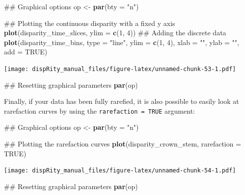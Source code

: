 \documentclass[]{book}
\newenvironment{Shaded}{\begin{snugshade}}{\end{snugshade}}
\newcommand{\KeywordTok}[1]{\textcolor[rgb]{0.13,0.29,0.53}{\textbf{#1}}}
\newcommand{\DataTypeTok}[1]{\textcolor[rgb]{0.13,0.29,0.53}{#1}}
\newcommand{\DecValTok}[1]{\textcolor[rgb]{0.00,0.00,0.81}{#1}}
\newcommand{\StringTok}[1]{\textcolor[rgb]{0.31,0.60,0.02}{#1}}
\newcommand{\OtherTok}[1]{\textcolor[rgb]{0.56,0.35,0.01}{#1}}
\newcommand{\NormalTok}[1]{#1}
\theoremstyle{definition}
\theoremstyle{definition}
\theoremstyle{remark}
\begin{document}
\begin{Shaded}
\begin{Highlighting}[]
\NormalTok{## Graphical options}
\NormalTok{op <-}\StringTok{ }\KeywordTok{par}\NormalTok{(}\DataTypeTok{bty =} \StringTok{"n"}\NormalTok{)}

\NormalTok{## Plotting the continuous disparity with a fixed y axis}
\KeywordTok{plot}\NormalTok{(disparity_time_slices, }\DataTypeTok{ylim =} \KeywordTok{c}\NormalTok{(}\DecValTok{1}\NormalTok{, }\DecValTok{4}\NormalTok{))}
\NormalTok{## Adding the discrete data}
\KeywordTok{plot}\NormalTok{(disparity_time_bins, }\DataTypeTok{type =} \StringTok{"line"}\NormalTok{, }\DataTypeTok{ylim =} \KeywordTok{c}\NormalTok{(}\DecValTok{1}\NormalTok{, }\DecValTok{4}\NormalTok{), }\DataTypeTok{xlab =} \StringTok{""}\NormalTok{, }\DataTypeTok{ylab =} \StringTok{""}\NormalTok{,}
    \DataTypeTok{add =} \OtherTok{TRUE}\NormalTok{)}
\end{Highlighting}
\end{Shaded}

\texttt{[image: dispRity\_manual\_files/figure-latex/unnamed-chunk-53-1.pdf]}

\begin{Shaded}
\begin{Highlighting}[]
\NormalTok{## Resetting graphical parameters}
\KeywordTok{par}\NormalTok{(op)}
\end{Highlighting}
\end{Shaded}

Finally, if your data has been fully rarefied, it is also possible to
easily look at rarefaction curves by using the
\texttt{rarefaction\ =\ TRUE} argument:

\begin{Shaded}
\begin{Highlighting}[]
\NormalTok{## Graphical options}
\NormalTok{op <-}\StringTok{ }\KeywordTok{par}\NormalTok{(}\DataTypeTok{bty =} \StringTok{"n"}\NormalTok{)}

\NormalTok{## Plotting the rarefaction curves}
\KeywordTok{plot}\NormalTok{(disparity_crown_stem, }\DataTypeTok{rarefaction =} \OtherTok{TRUE}\NormalTok{)}
\end{Highlighting}
\end{Shaded}

\texttt{[image: dispRity\_manual\_files/figure-latex/unnamed-chunk-54-1.pdf]}

\begin{Shaded}
\begin{Highlighting}[]
\NormalTok{## Resetting graphical parameters}
\KeywordTok{par}\NormalTok{(op)}
\end{Highlighting}
\end{Shaded}
\end{document}
